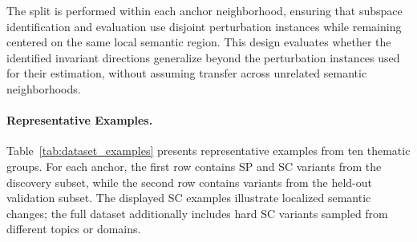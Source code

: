 The split is performed within each anchor neighborhood, ensuring that subspace identification and evaluation use disjoint perturbation instances while remaining centered on the same local semantic region. This design evaluates whether the identified invariant directions generalize beyond the perturbation instances used for their estimation, without assuming transfer across unrelated semantic neighborhoods.

\paragraph{Representative Examples.}
Table~\ref{tab:dataset_examples} presents representative examples from ten thematic groups. For each anchor, the first row contains SP and SC variants from the discovery subset, while the second row contains variants from the held-out validation subset. The displayed SC examples illustrate localized semantic changes; the full dataset additionally includes hard SC variants sampled from different topics or domains.

